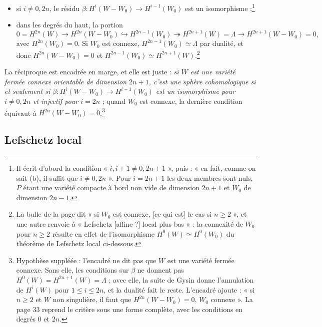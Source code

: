 \documentclass[11pt,a4paper]{article}
\begin{document}
\begin{itemize}
\item[a)] si $i \neq 0, 2n$, le résidu $\beta : H^{i}(W - W_0) \to
  H^{i-1}(W_0)$ est un isomorphisme ;\footnote{Il écrit d'abord la condition
  « $i, i+1 \neq 0, 2n+1$ », puis : « en fait, comme on sait (b), il suffit que
  $i \neq 0, 2n$ ». Pour $i = 2n+1$ les deux membres sont nuls, $P$ étant une
  variété compacte à bord non vide de dimension $2n+1$ et $W_0$ de dimension
  $2n-1$.}
\item[b)] dans les degrés du haut, la portion
  \[
    0 = H^{2n}(W) \to H^{2n}(W - W_0) \hookrightarrow H^{2n-1}(W_0)
    \twoheadrightarrow H^{2n+1}(W) = \Lambda \to H^{2n+1}(W - W_0) = 0 ,
  \]
  avec $H^{2n}(W_0) = 0$. Si $W_0$ est connexe, $H^{2n-1}(W_0) \simeq \Lambda$
  par dualité, et donc $H^{2n}(W - W_0) = 0$ et $H^{2n-1}(W_0) \simeq
  H^{2n+1}(W)$.\footnote{La bulle de la page dit « si $W_0$ est connexe, [ce
  qui est] le cas si $n \geq 2$ », et une autre renvoie à « Lefschetz
  [affine ?] local plus bas » : la connexité de $W_0$ pour $n \geq 2$ résulte
  en effet de l'isomorphisme $H^{0}(W) \simeq H^{0}(W_0)$ du théorème de
  Lefschetz local ci-dessous.}
\end{itemize}

La réciproque est encadrée en marge, et elle est juste : \emph{si $W$
est une variété fermée connexe orientable de dimension $2n+1$, c'est une sphère
cohomologique si et seulement si $\beta : H^{i}(W - W_0) \to H^{i-1}(W_0)$ est
un isomorphisme pour $i \neq 0, 2n$ et injectif pour $i = 2n$} ; quand $W_0$
est connexe, la dernière condition équivaut à $H^{2n}(W - W_0) =
0$.\footnote{Hypothèse suppléée : l'encadré ne dit pas que $W$ est une variété
fermée connexe. Sans elle, les conditions sur $\beta$ ne donnent pas
$H^{0}(W) = H^{2n+1}(W) = \Lambda$ ; avec elle, la suite de Gysin donne
l'annulation de $H^{i}(W)$ pour $1 \leq i \leq 2n$, et la dualité fait le
reste. L'encadré ajoute : « si $n \geq 2$ et $W$ non singulière, il faut que
$H^{2n}(W - W_0) = 0$, $W_0$ connexe ». La page 33 reprend le critère sous
une forme complète, avec les conditions en degrés $0$ et $2n$.}

\subsection*{Lefschetz local}
\end{document}

